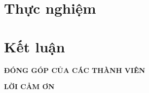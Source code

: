 \documentclass[conference]{IEEEtran}
\begin{document}
\section{Thực nghiệm}






















\section{Kết luận}


\begin{center}
\textbf{ĐÓNG GÓP CỦA CÁC THÀNH VIÊN}
\end{center}


\begin{center}
\textbf{LỜI CẢM ƠN}
\end{center}


\printbibliography
\end{document}

